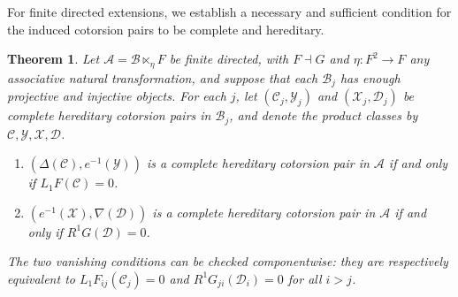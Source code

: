 \documentclass[11pt]{amsart}
\newtheorem{theorem}{Theorem}[section]
\theoremstyle{definition}
\theoremstyle{remark}
\theoremstyle{plain}
\numberwithin{equation}{section}
\begin{document}
For finite directed extensions, we establish a necessary and sufficient condition for the induced cotorsion pairs to be complete and hereditary.
\begin{theorem}\label{thm:directed}
	Let $\mathcal{A} = \mathcal{B} \ltimes_\eta F$ be finite directed, with $F \dashv G$ and
	$\eta: F^2 \to F$ any associative natural transformation, and suppose that
	each $\mathcal{B}_j$ has enough projective and injective objects. For each $j$,
	let $(\mathcal{C}_j, \mathcal{Y}_j)$ and $(\mathcal{X}_j, \mathcal{D}_j)$ be complete hereditary cotorsion
	pairs in $\mathcal{B}_j$, and denote the product classes by $\mathcal{C}, \mathcal{Y}, \mathcal{X}, \mathcal{D}$.
	\begin{enumerate}
		\item $(\Delta(\mathcal{C}), e^{-1}(\mathcal{Y}))$ is a complete hereditary cotorsion
		pair in $\mathcal{A}$ if and only if $L_1F(\mathcal{C}) = 0$.
		\item $(e^{-1}(\mathcal{X}), \nabla(\mathcal{D}))$ is a complete hereditary cotorsion
		pair in $\mathcal{A}$ if and only if $R^1G(\mathcal{D}) = 0$.
	\end{enumerate}
	The two vanishing conditions can be checked componentwise: they are
	respectively equivalent to $L_1F_{ij}(\mathcal{C}_j) = 0$ and
	$R^1G_{ji}(\mathcal{D}_i) = 0$ for all $i>j$.
\end{theorem}
\end{document}
